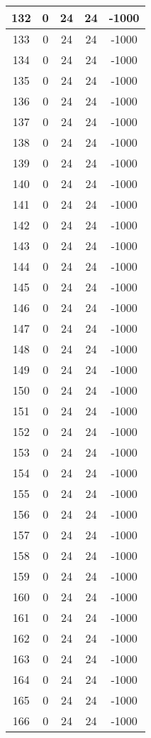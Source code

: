 \documentclass[letterpaper, 12pt]{article}
\begin{document}
\begin{longtable}{|c|c|c|c|c|}
\hline
132 & 0 & 24 & 24 & -1000 \\
\hline
133 & 0 & 24 & 24 & -1000 \\
\hline
134 & 0 & 24 & 24 & -1000 \\
\hline
135 & 0 & 24 & 24 & -1000 \\
\hline
136 & 0 & 24 & 24 & -1000 \\
\hline
137 & 0 & 24 & 24 & -1000 \\
\hline
138 & 0 & 24 & 24 & -1000 \\
\hline
139 & 0 & 24 & 24 & -1000 \\
\hline
140 & 0 & 24 & 24 & -1000 \\
\hline
141 & 0 & 24 & 24 & -1000 \\
\hline
142 & 0 & 24 & 24 & -1000 \\
\hline
143 & 0 & 24 & 24 & -1000 \\
\hline
144 & 0 & 24 & 24 & -1000 \\
\hline
145 & 0 & 24 & 24 & -1000 \\
\hline
146 & 0 & 24 & 24 & -1000 \\
\hline
147 & 0 & 24 & 24 & -1000 \\
\hline
148 & 0 & 24 & 24 & -1000 \\
\hline
149 & 0 & 24 & 24 & -1000 \\
\hline
150 & 0 & 24 & 24 & -1000 \\
\hline
151 & 0 & 24 & 24 & -1000 \\
\hline
152 & 0 & 24 & 24 & -1000 \\
\hline
153 & 0 & 24 & 24 & -1000 \\
\hline
154 & 0 & 24 & 24 & -1000 \\
\hline
155 & 0 & 24 & 24 & -1000 \\
\hline
156 & 0 & 24 & 24 & -1000 \\
\hline
157 & 0 & 24 & 24 & -1000 \\
\hline
158 & 0 & 24 & 24 & -1000 \\
\hline
159 & 0 & 24 & 24 & -1000 \\
\hline
160 & 0 & 24 & 24 & -1000 \\
\hline
161 & 0 & 24 & 24 & -1000 \\
\hline
162 & 0 & 24 & 24 & -1000 \\
\hline
163 & 0 & 24 & 24 & -1000 \\
\hline
164 & 0 & 24 & 24 & -1000 \\
\hline
165 & 0 & 24 & 24 & -1000 \\
\hline
166 & 0 & 24 & 24 & -1000 \\

\end{longtable}
\end{document}
